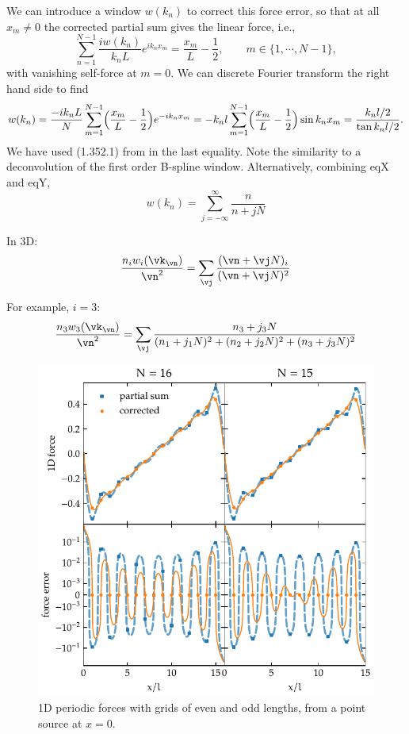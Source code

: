 \documentclass[a4paper]{article}
\newcommand{\1}{\mathds{1}}
\newcommand{\YL}[1]{\textcolor{Bittersweet}{#1}}
\begin{document}
We can introduce a window $w(k_n)$ to correct this force error, so that
at all $x_m \neq 0$ the corrected partial sum gives the linear force,
i.e.,
%
\begin{equation}
\sum_{n=1}^{N-1} \frac{i w(k_n)}{k_n L} e^{i k_n x_m}
= \frac{x_m}L - \frac12,
\qquad m \in \{1, \cdots, N-1\},
\end{equation}
%
with vanishing self-force at $m=0$.
We can discrete Fourier transform the right hand side to find
%
\begin{equation}
w(k_n) = \frac{-i k_n L}N \sum_{m=1}^{N-1}
\Bigl( \frac{x_m}L - \frac12 \Bigr) e^{-i k_n x_m}
%
= - k_n l \sum_{m=1}^{N-1}
\Bigl( \frac{x_m}L - \frac12 \Bigr) \sin k_n x_m
%
= \frac{k_n l / 2}{\tan k_n l / 2}.
\end{equation}
%
We have used (1.352.1) from \cite{TISP} in the last equality.
\YL{Note the similarity to a deconvolution of the first order B-spline
window.}
Alternatively, combining eqX and eqY,
%
\begin{equation}
w(k_n) = \sum_{j=-\infty}^\infty \frac{n}{n+jN}
\end{equation}
%

In 3D:
%
\begin{equation}
\frac{n_i w_i(\vk_\vn)}{\vn^2}
= \sum_\vj \frac{(\vn + \vj N)_i}{(\vn + \vj N)^2}
\end{equation}
%

For example, $i=3$:
%
\begin{equation}
\frac{n_3 w_3(\vk_\vn)}{\vn^2}
= \sum_\vj
\frac{n_3 + j_3 N}{(n_1 + j_1 N)^2 + (n_2 + j_2 N)^2 + (n_3 + j_3 N)^2}
\end{equation}
%


\begin{figure}[t]
\centering
\includegraphics[width=0.7\linewidth]{force1D.pdf}
\caption{1D periodic forces with grids of even and odd lengths, from a
point source at $x=0$.}
\label{fig:force1D}
\end{figure}
\end{document}
